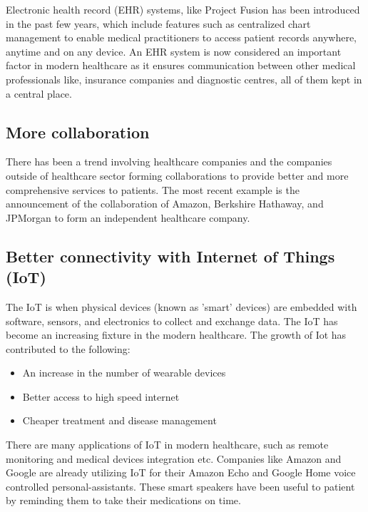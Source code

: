 \documentclass[10pt]{article}
\begin{document}
Electronic health record (EHR) systems, like Project Fusion has been introduced in the past few years, which include features such as centralized chart management to enable medical practitioners to access patient records anywhere, anytime and on any device. An EHR system is now considered an important factor in modern healthcare as it ensures communication between other medical professionals like, insurance companies and diagnostic centres, all of them kept in a central place.


\subsection{More collaboration}

There has been a trend involving healthcare companies and the companies outside of healthcare sector forming collaborations to provide better and more comprehensive services to patients. The most recent example is the announcement of the collaboration of Amazon, Berkshire Hathaway, and JPMorgan to form an independent healthcare company.


\subsection{Better connectivity with Internet of Things (IoT)}

The IoT is when physical devices (known as 'smart' devices) are embedded with software, sensors, and electronics to collect and exchange data. The IoT has become an increasing fixture in the modern healthcare. The growth of Iot has contributed to the following:

\begin{itemize}

    \item An increase in the number of wearable devices
    \item Better access to high speed internet
    \item Cheaper treatment and disease management
    
\end{itemize}

There are many applications of IoT in modern healthcare, such as remote monitoring and medical devices integration etc. Companies like Amazon and Google are already utilizing IoT for their Amazon Echo and Google Home voice controlled personal-assistants. These smart speakers have been useful to patient by reminding them to take their medications on time.
\end{document}

